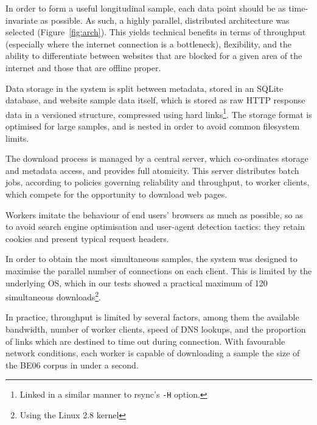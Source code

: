 \documentclass[11pt]{article}
\begin{document}
In order to form a useful longitudinal sample, each data point should be as time-invariate as possible.  As such, a highly parallel, distributed architecture was selected (Figure~\ref{fig:arch}).  This yields technical benefits in terms of throughput (especially where the internet connection is a bottleneck), flexibility, and the ability to differentiate between websites that are blocked for a given area of the internet and those that are offline proper.

Data storage in the system is split between metadata, stored in an SQLite database, and website sample data itself, which is stored as raw HTTP response data in a versioned structure, compressed using hard links\footnote{Linked in a similar manner to rsync's \texttt{-H} option.}.  The storage format is optimised for large samples, and is nested in order to avoid common filesystem limits.

The download process is managed by a central server, which co-ordinates storage and metadata access, and provides full atomicity.  This server distributes batch jobs, according to policies governing reliability and throughput, to worker clients, which compete for the opportunity to download web pages.

Workers imitate the behaviour of end users' browsers as much as possible, so as to avoid search engine optimisation and user-agent detection tactics: they retain cookies and present typical request headers.

In order to obtain the most simultaneous samples, the system was designed to maximise the parallel number of connections on each client.  This is limited by the underlying OS, which in our tests showed a practical maximum of 120 simultaneous downloads\footnote{Using the Linux 2.8 kernel}.

In practice, throughput is limited by several factors, among them the available bandwidth, number of worker clients, speed of DNS lookups, and the proportion of links which are destined to time out during connection.  With favourable network conditions, each worker is capable of downloading a sample the size of the BE06 corpus in under a second.
\end{document}
